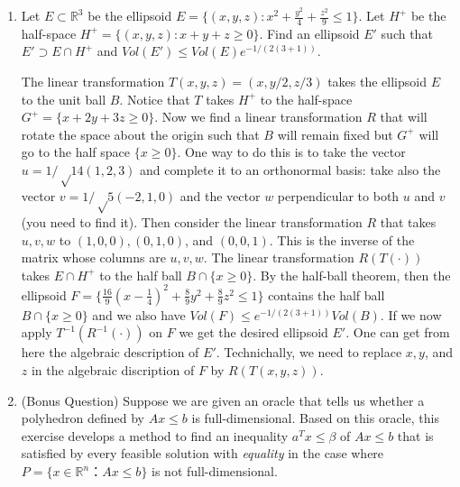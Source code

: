 \documentclass[11pt]{article}
\newcommand{\setR}{\mathbb{R}}
\begin{document}
\begin{enumerate}[1)]
\item Let $E ⊂\setR^3$ be the ellipsoid $E= \{(x,y,z) :x^2 + \frac{y^2}{4} + \frac{z^2}
{9} ≤1\}$.
Let $H^+$ be the half-space $H^+ = \{(x,y,z) : x+ y+ z ≥0\}$.
Find an ellipsoid $E'$ such that $E'⊃E∩H^+$ and $Vol(E') ≤Vol(E)e^{−1/(2(3+1))}$.

\begin{solution}
The linear transformation $T(x,y,z) = (x,y/2, z/3)$ takes the ellipsoid $E$ to the unit ball $B$. Notice that $T$ takes $H^+$ to the half-space
$G^+ = \{x+2y+3z ≥0\}$. Now we find a linear transformation $R$ that will
rotate the space about the origin such that $B$ will remain fixed but $G^+$
will go to the half space $\{x ≥0\}$. One way to do this is to take the vector $u=1/√14 (1,2,3)$ and complete it to an
orthonormal basis: take also the vector $v=1/√5 (−2,1,0)$ and the vector
$w$ perpendicular to both $u$ and $v$ (you need to find it). Then consider
the linear transformation $R$ that takes $u,v,w$ to $(1,0,0),(0,1,0)$, and
$(0,0,1)$. This is the inverse of the matrix whose columns are $u,v,w$.
The linear transformation $R(T(·))$ takes $E∩H^+$ to the half ball $B∩\{x≥
0\}$. By the half-ball theorem, then the ellipsoid
$F= \{\frac{16}{9}(x−\frac{1}{4})^2 + \frac{8}{9} y^2 + \frac{8}{9} z^2 ≤1\}$ contains the half ball $B∩\{x≥0\}$
and we also have $Vol(F) ≤e^{−1/(2(3+1))} Vol(B)$.
If we now apply $T^{−1}(R^{−1}(·))$ on $F$ we get the desired ellipsoid $E'$. One
can get from here the algebraic description of $E'$. Technichally, we need
to replace $x,y$, and $z$ in the algebraic discription of $F$ by $R(T(x,y,z))$.
\end{solution}
  
  
  
  \item (Bonus Question) Suppose we are given an oracle that tells us whether a
   polyhedron defined by $Ax ≤b$ is full-dimensional. Based on this oracle,
   this exercise develops a method to find an inequality $a^Tx ≤ β$ of
   $Ax ≤b$ that is satisfied by every feasible solution with
   \emph{equality} in the case where $P = \{ x ∈ ℝ^n ： Ax≤b\}$ is not
   full-dimensional.



\end{enumerate}
\end{document}
